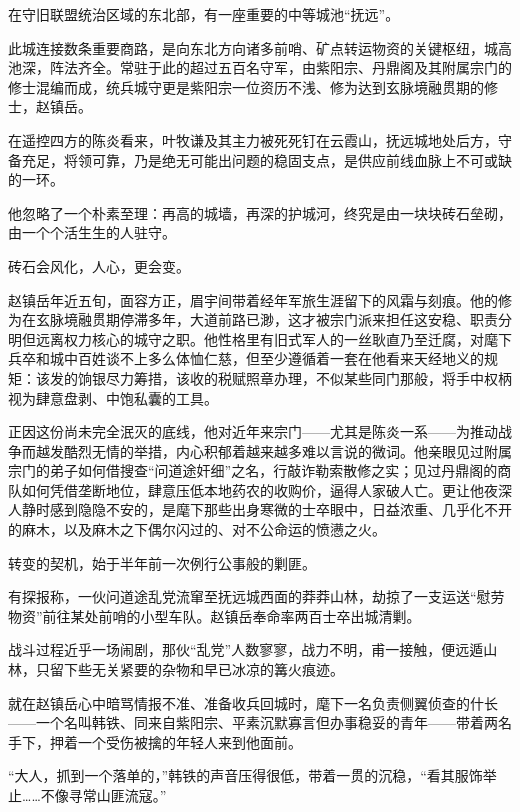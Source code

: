 \vspace{2em}

在守旧联盟统治区域的东北部，有一座重要的中等城池“抚远”。

此城连接数条重要商路，是向东北方向诸多前哨、矿点转运物资的关键枢纽，城高池深，阵法齐全。常驻于此的超过五百名守军，由紫阳宗、丹鼎阁及其附属宗门的修士混编而成，统兵城守更是紫阳宗一位资历不浅、修为达到玄脉境融贯期的修士，赵镇岳。

在遥控四方的陈炎看来，叶牧谦及其主力被死死钉在云霞山，抚远城地处后方，守备充足，将领可靠，乃是绝无可能出问题的稳固支点，是供应前线血脉上不可或缺的一环。

他忽略了一个朴素至理：再高的城墙，再深的护城河，终究是由一块块砖石垒砌，由一个个活生生的人驻守。

砖石会风化，人心，更会变。

赵镇岳年近五旬，面容方正，眉宇间带着经年军旅生涯留下的风霜与刻痕。他的修为在玄脉境融贯期停滞多年，大道前路已渺，这才被宗门派来担任这安稳、职责分明但远离权力核心的城守之职。他性格里有旧式军人的一丝耿直乃至迁腐，对麾下兵卒和城中百姓谈不上多么体恤仁慈，但至少遵循着一套在他看来天经地义的规矩：该发的饷银尽力筹措，该收的税赋照章办理，不似某些同门那般，将手中权柄视为肆意盘剥、中饱私囊的工具。

正因这份尚未完全泯灭的底线，他对近年来宗门——尤其是陈炎一系——为推动战争而越发酷烈无情的举措，内心积郁着越来越多难以言说的微词。他亲眼见过附属宗门的弟子如何借搜查“问道途奸细”之名，行敲诈勒索散修之实；见过丹鼎阁的商队如何凭借垄断地位，肆意压低本地药农的收购价，逼得人家破人亡。更让他夜深人静时感到隐隐不安的，是麾下那些出身寒微的士卒眼中，日益浓重、几乎化不开的麻木，以及麻木之下偶尔闪过的、对不公命运的愤懑之火。

\vspace{2em}

转变的契机，始于半年前一次例行公事般的剿匪。

有探报称，一伙问道途乱党流窜至抚远城西面的莽莽山林，劫掠了一支运送“慰劳物资”前往某处前哨的小型车队。赵镇岳奉命率两百士卒出城清剿。

战斗过程近乎一场闹剧，那伙“乱党”人数寥寥，战力不明，甫一接触，便远遁山林，只留下些无关紧要的杂物和早已冰凉的篝火痕迹。

就在赵镇岳心中暗骂情报不准、准备收兵回城时，麾下一名负责侧翼侦查的什长——一个名叫韩铁、同来自紫阳宗、平素沉默寡言但办事稳妥的青年——带着两名手下，押着一个受伤被擒的年轻人来到他面前。

“大人，抓到一个落单的，”韩铁的声音压得很低，带着一贯的沉稳，“看其服饰举止……不像寻常山匪流寇。”

